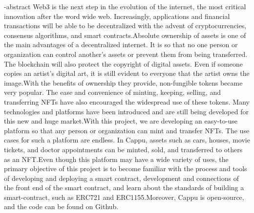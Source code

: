 
\en-abstract{
  Web3 is the next step in the evolution of the internet, the most critical innovation after the word wide web. Increasingly, applications and financial transactions will be able to be decentralized with the advent of cryptocurrencies, consensus algorithms, and smart contracts.\newline \indent Absolute ownership of assets is one of the main advantages of a decentralized internet. It is so that no one person or organization can control another's assets or prevent them from being transferred. The blockchain will also protect the copyright of digital assets. Even if someone copies an artist's digital art, it is still evident to everyone that the artist owns the image.\newline \indent With the benefits of ownership they provide, non-fungible tokens became very popular. The ease and convenience of minting, keeping, selling, and transferring NFTs have also encouraged the widespread use of these tokens. Many technologies and platforms have been introduced and are still being developed for this new and huge market.\newline \indent With this project, we are developing an easy-to-use platform so that any person or organization can mint and transfer NFTs. The use cases for such a platform are endless. In Cappu, assets such as cars, houses, movie tickets, and doctor appointments can be minted, sold, and transferred to others as an NFT.\newline \indent Even though this platform may have a wide variety of uses, the primary objective of this project is to become familiar with the process and tools of developing and deploying a smart contract, development and connections of the front end of the smart contract, and learn about the standards of building a smart-contract, such as ERC721 and ERC1155.\newline \indent Moreover, Cappu is open-source, and the code can be found on Github.
}
